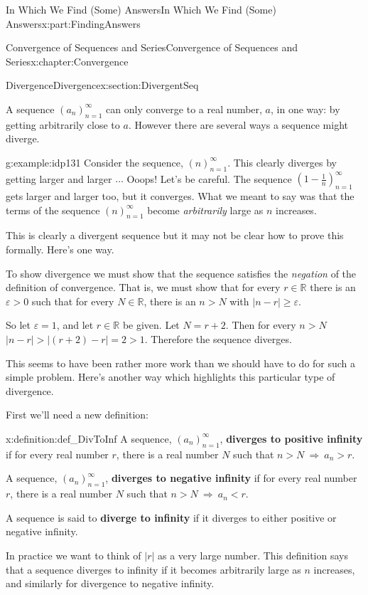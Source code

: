 \documentclass[oneside,10pt,]{book}
\newcommand{\terminology}[1]{\textbf{#1}}
\numberwithin{equation}{section}
\newcommand{\imp}{\ \Rightarrow\ }
\newcommand{\abs}[1]{\left|#1\right|}
\newcommand{\eps}{\varepsilon}
\newcommand{\RR}{\mathbb {R}}
\newcommand{\lt}{<}
\begin{document}
\begin{partptx}{In Which We Find (Some) Answers}{}{In Which We Find (Some) Answers}{}{}{x:part:FindingAnswers}
\begin{chapterptx}{Convergence of Sequences and Series}{}{Convergence of Sequences and Series}{}{}{x:chapter:Convergence}
\begin{sectionptx}{Divergence}{}{Divergence}{}{}{x:section:DivergentSeq}
\par
A sequence \(\left(a_n\right)_{n=1}^\infty\) can only converge to a real number, \(a\), in one way: by getting arbitrarily close to \(a\). However there are several ways a sequence might diverge.%
\begin{example}{}{g:example:idp131}%
Consider the sequence, \(\left(n\right)_{n=1}^\infty\). This clearly diverges by getting larger and larger \(\ldots\) Ooops! Let's be careful. The sequence \(\left(1-\frac1n\right)_{n=1}^\infty\) gets larger and larger too, but it converges. What we meant to say was that the terms of the sequence \(\left(n\right)_{n=1}^\infty\) become \emph{arbitrarily} large as \(n\) increases.%
\par
This is clearly a divergent sequence but it may not be clear how to prove this formally. Here's one way.%
\par
To show divergence we must show that the sequence satisfies the \emph{negation} of the definition of convergence. That is, we must show that for every \(r\in\RR\) there is an \(\eps>0\) such that for every \(N\in\RR\), there is an \(n>N\) with \(\left|n-r\right|\ge\eps\).%
\par
So let \(\eps=1\), and let \(r\in\RR\) be given. Let \(N=r+2\). Then for every \(n>N\) \(\abs{n-r} > \abs{(r+2)-r}=2>1\). Therefore the sequence diverges.%
\end{example}
This seems to have been rather more work than we should have to do for such a simple problem. Here's another way which highlights this particular type of divergence.%
\par
First we'll need a new definition:%
\begin{definition}{}{x:definition:def_DivToInf}%
 A sequence, \(\left(a_n\right)_{n=1}^\infty\), \terminology{diverges to positive infinity} if for every real number \(r\), there is a real number \(N\) such that \(n>N\imp a_n>r\).%
\par
{} A sequence, \(\left(a_n\right)_{n=1}^\infty\), \terminology{diverges to negative infinity} if for every real number \(r\), there is a real number \(N\) such that \(n>N\imp a_n\lt r\).%
\par
{} A sequence is said to \terminology{diverge to infinity} if it diverges to either positive or negative infinity.%
\end{definition}
In practice we want to think of \(\abs{r}\) as a very large number. This definition says that a sequence diverges to infinity if it becomes arbitrarily large as \(n\) increases, and similarly for divergence to negative infinity.%

\end{sectionptx}
\end{chapterptx}
\end{partptx}
\end{document}
